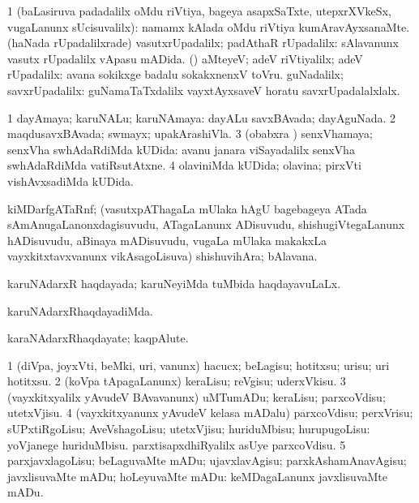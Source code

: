 \noindent
\gl{\nuga}
\bmng
\bnum
\num{1}  (baLasiruva padadalilx oMdu riVtiya, bageya asapxSaTxte, utepxrXVkeSx, \mo vugaLanunx sUcisuvalilx):  namamx kAlada oMdu riVtiya kumAravAyxsanaMte. 
  
\banum
{} (haNada rUpadalilxrade) vasutxrUpadalilx; padAthaR rUpadalilx:  sAlavanunx vasutx rUpadalilx vApasu mADida. 
 (\rUpa) aMteyeV; adeV riVtiyalilx; adeV rUpadalilx:  avana sokikxge badalu sokakxnenxV toVru. 
 guNadalilx; savxrUpadalilx:  guNamaTaTxdalilx vayxtAyxsaveV horatu savxrUpadalalxlalx. 
\eanum
\numie
\enum
\emng
\eentry

\bentry
{}
\gl{\gu}
\bmng
\bnum
\num{1} dayAmaya; karuNALu; karuNAmaya:  dayALu savxBAvada; dayAguNada. 
\num{2} maqdusavxBAvada; swmayx; upakArashiVla. 
\num{3} (obabxra \vi) senxVhamaya; senxVha swhAdaRdiMda kUDida:  avanu janara viSayadalilx senxVha swhAdaRdiMda vatiRsutAtxne. 
\num{4} olaviniMda kUDida; olavina; pirxVti vishAvxsadiMda kUDida. 
\enum
\emng
\eentry

\bentry
{}
\gl{\nA}
\bmng
kiMDarfgATaRnf; (vasutxpAThagaLa mUlaka hAgU bagebageya ATada sAmAnugaLanonxdagisuvudu, ATagaLanunx ADisuvudu, shishugiVtegaLanunx hADisuvudu, aBinaya mADisuvudu, \mo vugaLa mUlaka makakxLa vayxkitxtavxvanunx vikAsagoLisuva) shishuvihAra; bAlavana. 
\emng
\eentry

\bentry
{}
\gl{\gu}
\bmng
karuNAdarxR haqdayada; karuNeyiMda tuMbida haqdayavuLaLx. 
\emng
\eentry

\bentry
{}
\gl{\kirxvi}
\bmng
karuNAdarxRhaqdayadiMda. 
\emng
\eentry

\bentry
{}
\gl{\nA}
\bmng
karaNAdarxRhaqdayate; kaqpAlute. 
\emng
\eentry

\bentry
{}
\gl{\sakirx}
\bmng
\bnum
\num{1} (diVpa, joyxVti, beMki, uri, \mo vanunx) hacucx; beLagisu; hotitxsu; urisu; uri hotitxsu. 
\num{2} (koVpa tApagaLanunx) keraLisu; reVgisu; uderxVkisu. 
\num{3} (vayxkitxyalilx yAvudeV BAvavanunx) uMTumADu; keraLisu; parxcoVdisu; utetxVjisu. 
\num{4} (vayxkitxyanunx yAvudeV kelasa mADalu) parxcoVdisu; perxVrisu; sUPxtiRgoLisu; AveVshagoLisu; utetxVjisu; huriduMbisu; hurupugoLisu:  yoVjanege huriduMbisu.  parxtisapxdhiRyalilx asUye parxcoVdisu. 
\num{5} parxjavxlagoLisu; beLaguvaMte mADu; ujavxlavAgisu; parxkAshamAnavAgisu; javxlisuvaMte mADu; hoLeyuvaMte mADu:  keMDagaLanunx javxlisuvaMte mADu. 
\enum
\emng

